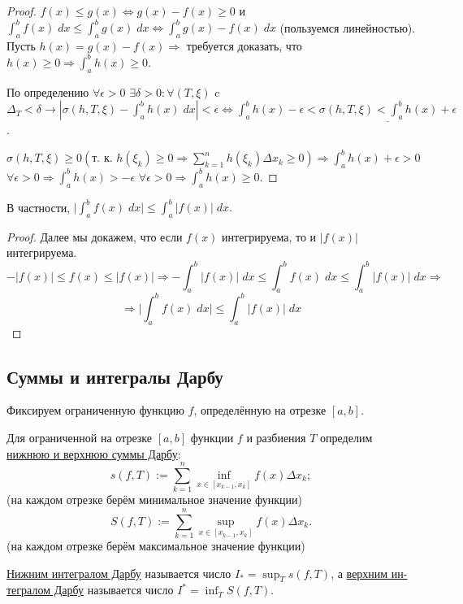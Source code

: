     \begin{proof}
    	$f(x) \leqslant g(x) \Leftrightarrow g(x) - f(x) \geqslant 0$ и $\int_a^b f(x) \; dx \leqslant \int_a^b g(x) \; dx \Leftrightarrow \int_a^b g(x) - f(x) \; dx$ (пользуемся линейностью). Пусть $h(x) = g(x) - f(x) \Rightarrow$ требуется доказать, что $h(x) \geqslant 0 \Rightarrow \int_a^b h(x) \geqslant 0$.
    	
    	По определению $\forall \epsilon > 0$ $\exists \delta > 0 : \forall (T, \xi)$ c $\Delta_T < \delta \rightarrow  |\sigma(h, T, \xi) - \int_a^b h(x) \; dx| < \epsilon \Leftrightarrow \int_a^b h(x) - \epsilon < \underline{\sigma(h, T, \xi) < \int_a^b h(x) + \epsilon}$.
    	
    	$\sigma(h, T, \xi) \geqslant 0 (\text{т. к. } h(\xi_k) \geqslant 0 \Rightarrow \sum_{k = 1}^n h(\xi_k) \Delta x_k \geqslant 0) \Rightarrow \int_a^b h(x) + \epsilon > 0$ $\forall \epsilon > 0 \Rightarrow \int_a^b h(x) > -\epsilon$ $\forall \epsilon > 0 \Rightarrow \int_a^b h(x) \geqslant 0.$
    \end{proof}
    
    \begin{mention}
    	В частности, $\bigg|\displaystyle\int^b_a f(x) \; dx\bigg| \leqslant \displaystyle\int^b_a |f(x)| \; dx.$
    \end{mention}
    
    \begin{proof}
    	Далее мы докажем, что если $f(x)$ интегрируема, то и $|f(x)|$ интегрируема.
    	\[ -|f(x)| \leqslant f(x) \leqslant |f(x)|  \Rightarrow -\int_a^b |f(x)| \; dx \leqslant \int_a^b f(x) \; dx \leqslant \int_a^b |f(x)| \; dx \Rightarrow \]
    	\[ \Rightarrow \bigg| \int_a^b f(x) \; dx \bigg| \leqslant \int_a^b |f(x)| \; dx \]
    \end{proof}
    
    \subsection{Суммы и интегралы Дарбу}
    
    Фиксируем ограниченную функцию $f$, определённую на отрезке $[a, b]$.
    
    \begin{definition}
    	Для ограниченной на отрезке $[a, b]$ функции $f$ и разбиения $T$ определим \underline{нижнюю и верхнюю суммы Дарбу}:
    	\[s(f, T) := \sum^n_{k = 1}\inf_{x \in [x_{k - 1}, x_k]} f(x) \Delta x_k;\] (на каждом отрезке берём минимальное значение функции)
    	\[S(f, T) := \sum^n_{k = 1}\sup_{x \in [x_{k - 1}, x_k]} f(x) \Delta x_k.\] (на каждом отрезке берём максимальное значение функции)
    	
    	\underline{Нижним интегралом Дарбу} называется число $I_{*} = \displaystyle\sup_{T} s(f, T)$, а \underline{верхним ин-}
    	\underline{тегралом Дарбу} называется число $I^{*} = \displaystyle\inf_{T} S(f, T).$
    \end{definition}
    
